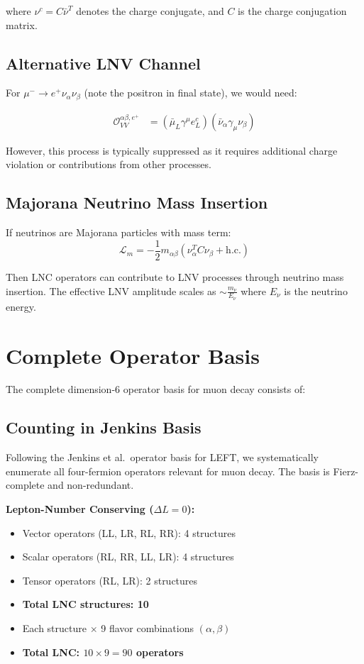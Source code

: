 \documentclass[11pt,a4paper]{article}
\begin{document}
where $\nu^c = C\bar{\nu}^T$ denotes the charge conjugate, and $C$ is the charge conjugation matrix.

\subsection{Alternative LNV Channel}

For $\mu^- \to e^+ \nu_\alpha \nu_\beta$ (note the positron in final state), we would need:

\begin{align}
\mathcal{O}_{VV}^{\alpha\beta,e^+} &= (\bar{\mu}_L \gamma^\mu e_L^c)(\bar{\nu}_\alpha \gamma_\mu \nu_\beta)
\end{align}

However, this process is typically suppressed as it requires additional charge violation or contributions from other processes.

\subsection{Majorana Neutrino Mass Insertion}

If neutrinos are Majorana particles with mass term:
\begin{equation}
\mathcal{L}_m = -\frac{1}{2} m_{\alpha\beta} (\nu_\alpha^T C \nu_\beta + \text{h.c.})
\end{equation}

Then LNC operators can contribute to LNV processes through neutrino mass insertion. The effective LNV amplitude scales as $\sim \frac{m_\nu}{E_\nu}$ where $E_\nu$ is the neutrino energy.

\section{Complete Operator Basis}

The complete dimension-6 operator basis for muon decay consists of:

\subsection{Counting in Jenkins Basis}

Following the Jenkins et al.\ operator basis for LEFT, we systematically enumerate all four-fermion operators relevant for muon decay. The basis is Fierz-complete and non-redundant.

\textbf{Lepton-Number Conserving ($\Delta L = 0$):}
\begin{itemize}
\item Vector operators (LL, LR, RL, RR): 4 structures
\item Scalar operators (RL, RR, LL, LR): 4 structures
\item Tensor operators (RL, LR): 2 structures
\item \textbf{Total LNC structures: 10}
\item Each structure $\times$ 9 flavor combinations $(\alpha,\beta)$
\item \textbf{Total LNC: $10 \times 9 = 90$ operators}
\end{itemize}
\end{document}
